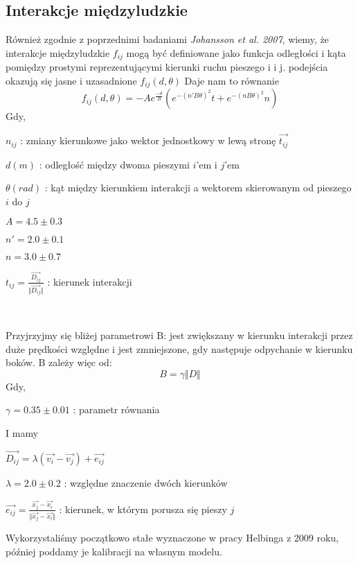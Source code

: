 \subsection{Interakcje międzyludzkie}
\hspace{4ex}Również zgodnie z poprzednimi badaniami {\it Johansson et al. 2007}, wiemy, że interakcje międzyludzkie $f_{ij}$ mogą być definiowane jako funkcja odległości i kąta pomiędzy prostymi reprezentującymi kierunki ruchu pieszego i i j. podejścia okazują się jasne i uzasadnione $f_{ij}(d,\theta)$ Daje nam to równanie
$$
f_{ij}(d,\theta) = -Ae^{\frac{-d}{B}}(e^{-(n'B\theta)^2}t + e^{-(nB\theta)^2}n)
$$
Gdy,\\
\centerline{$n_{ij}$ : zmiany kierunkowe jako wektor jednostkowy w lewą stronę $\vec{t_{ij}}$}
\centerline{$d(m)$ : odległość między dwoma pieszymi $i$'em i $j$'em}
\centerline{$\theta(rad)$ : kąt między kierunkiem interakcji a wektorem skierowanym od pieszego $i$ do $j$}
\centerline{$A = 4.5 \pm 0.3$}
\centerline{$n' = 2.0 \pm 0.1$}
\centerline{$n = 3.0 \pm 0.7$}
\centerline{$t_{ij} = \frac{\vec{D_{ij}}}{\Vert \vec{D_{ij}} \Vert}$ : kierunek interakcji}\\
\par
Przyjrzyjmy się bliżej parametrowi B: jest zwiększany w kierunku interakcji przez duże prędkości względne i jest zmniejszone, gdy następuje odpychanie w kierunku boków. B zależy więc od:
$$
B = \gamma \Vert D \Vert
$$
Gdy,\\
\centerline{$\gamma = 0.35 \pm 0.01$ : parametr równania}
I mamy \\ \centerline{$\vec{D_{ij}} = \lambda(\vec{v_i} - \vec{v_j}) + \vec{e_{ij}}$}
\centerline{$\lambda = 2.0 \pm 0.2$ : względne znaczenie dwóch kierunków}
\centerline{$\vec{e_{ij}} = \frac{\vec{x_j}-\vec{x_i}}{\Vert \vec{x_j} - \vec{x_i} \Vert}$ : kierunek, w którym porusza się pieszy $j$}


Wykorzystaliśmy początkowo stałe wyznaczone w pracy Helbinga z 2009 roku, później poddamy je kalibracji na własnym modelu.
